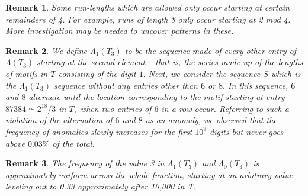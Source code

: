 \documentclass{article}
\newtheorem{remark}{Remark}[section]
\begin{document}
\begin{remark}
Some run-lengths which are allowed only occur starting at certain remainders of 4. For example, runs of length 8 only occur starting at 2 \emph{mod} 4. More investigation may be needed to uncover patterns in these.
\end{remark}

\begin{remark}
We define $\Lambda_1(T_3)$ to be the sequence made of every other entry of $\Lambda(T_3)$ starting at the second element -- that is, the series made up of the lengths of motifs in $T$ consisting of the digit $1.$ Next, we consider the sequence $S$ which is the $\Lambda_1(T_3)$ sequence without any entries other than $6$ or $8.$ In this sequence, $6$ and $8$ alternate until the location corresponding to the motif starting at entry $87384 \simeq 2^{18}/3$ in $T,$ when two entries of $6$ in a row occur. Referring to such a violation of the alternation of $6$ and $8$ as an \emph{anomaly}, we observed that the frequency of anomalies slowly increases for the first $10^9$ digits but never goes above $0.03\%$ of the total.
\end{remark}

\begin{remark}
The frequency of the value 3 in $\Lambda{_1(T_3)}$ and $\Lambda{_0(T_3)}$ is approximately uniform across the whole function, starting at an arbitrary value leveling out to 0.33 approximately after 10,000 in T.
\end{remark}
\end{document}

